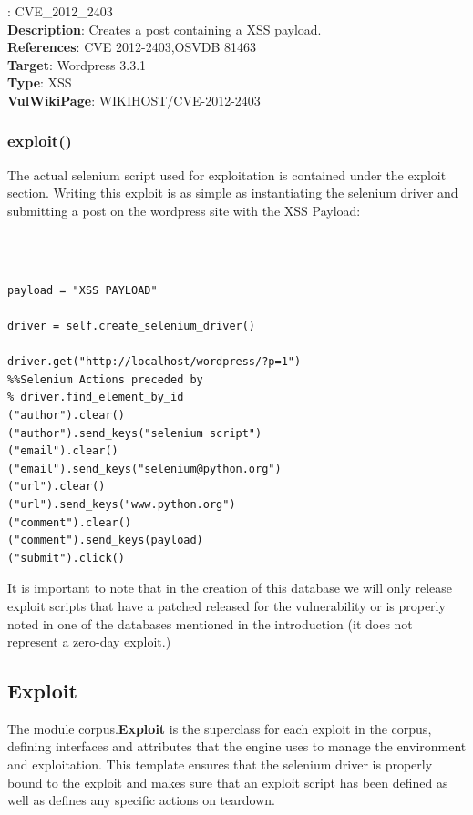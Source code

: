 \documentclass[letterpaper,twocolumn,10pt]{article}
\begin{document}
{\tt \small

:	CVE\_2012\_2403\\
{\bf Description}:		Creates a post containing a XSS payload.\\
{\bf References}:	CVE 2012-2403,OSVDB 81463 \\
{\bf Target}: 		Wordpress 3.3.1\\
{\bf Type}: 		XSS\\
{\bf VulWikiPage}: WIKIHOST/CVE-2012-2403

}

\subsubsection{exploit()}

The actual selenium script used for exploitation is contained under the exploit section.  Writing this exploit is as simple as instantiating the selenium driver and submitting a post on the wordpress site with the XSS Payload: 

{\tt \footnotesize
\begin{verbatim}

payload = "XSS PAYLOAD"

driver = self.create_selenium_driver()

driver.get("http://localhost/wordpress/?p=1")
%%Selenium Actions preceded by
% driver.find_element_by_id
("author").clear()
("author").send_keys("selenium script")
("email").clear()
("email").send_keys("selenium@python.org")
("url").clear()
("url").send_keys("www.python.org")
("comment").clear()
("comment").send_keys(payload)
("submit").click()

\end{verbatim}
}

It is important to note that in the creation of this database we will only release exploit scripts that have a patched released for the vulnerability or is properly noted in one of the databases mentioned in the introduction (it does not represent a zero-day exploit.)


\subsection{Exploit}
The module corpus.{\bf Exploit} is the superclass for each exploit in the corpus, defining interfaces and attributes that the engine uses to manage the environment and exploitation.  This template ensures that the selenium driver is properly bound to the exploit and makes sure that an exploit script has been defined as well as defines any specific actions on teardown.
\end{document}
